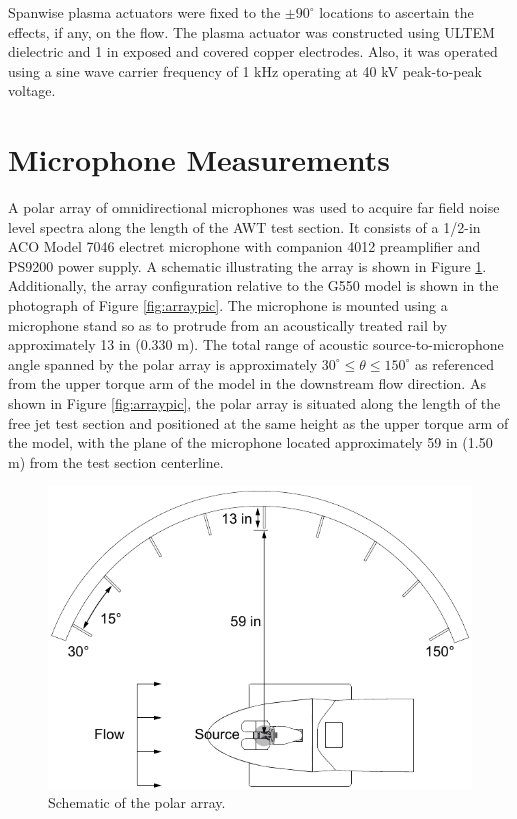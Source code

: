 Spanwise plasma actuators were fixed to the $\pm 90^\circ$ locations to ascertain the effects, if any, on the flow. The plasma actuator was constructed using ULTEM dielectric and 1 in exposed and covered copper electrodes. Also, it was operated using a sine wave carrier frequency of 1 kHz operating at 40 kV peak-to-peak voltage.

\section{Microphone Measurements}
A polar array of omnidirectional microphones was used to acquire far field noise level spectra along the length of the AWT test section. It consists of a 1/2-in ACO Model 7046 electret microphone with companion 4012 preamplifier and PS9200 power supply. A schematic illustrating the array is shown in Figure \ref{fig:array}. Additionally, the array configuration relative to the G550 model is shown in the photograph of Figure \ref{fig:arraypic}. The microphone is mounted using a microphone stand so as to protrude from an acoustically treated rail by approximately 13 in (0.330 m). The total range of acoustic source-to-microphone angle spanned by the polar array is approximately $30^\circ \leq \theta \leq 150^\circ$ as referenced from the upper torque arm of the model in the downstream flow direction. As shown in Figure \ref{fig:arraypic}, the polar array is situated along the length of the free jet test section and positioned at the same height as the upper torque arm of the model, with the plane of the microphone located approximately 59 in (1.50 m) from the test section centerline.

\begin{figure}
	\begin{center}
		\centerline{\includegraphics[scale=1.2]{figures/array_schematic}}
		\caption{Schematic of the polar array.}
		\label{fig:array}
	\end{center}
\end{figure}

